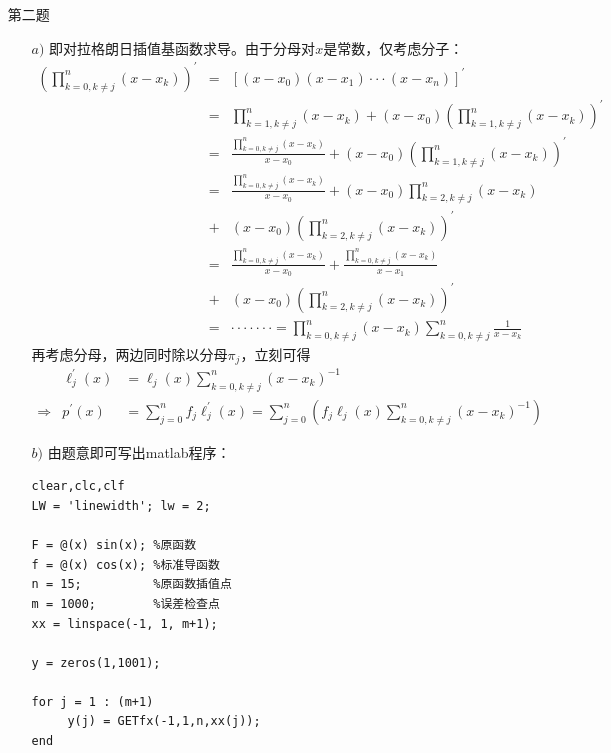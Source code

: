 \documentclass[12pt,a4paper,utf8]{ctexart}
\begin{document}
\begin{enumerate}
\begin{enumerate}
     
  \end{enumerate}
\item[第二题]
  \begin{enumerate}
    \item[$a)$] 即对拉格朗日插值基函数求导。由于分母对$x$是常数，仅考虑分子：
        \begin{eqnarray} 
            \left(\prod_{k=0,k\neq j}^{n}(x-x_k)\right)^{'} &=& [(x-x_0)(x-x_1)···(x-x_n)]^{'}\\
            &=& \prod_{k=1,k\neq j}^{n}(x-x_k)+(x-x_0)\left(\prod_{k=1,k\neq j}^{n}(x-x_k)\right)^{'}\\
            &=& \frac{\prod_{k=0,k\neq j}^{n}(x-x_k)}{x-x_0}+(x-x_0)\left(\prod_{k=1,k\neq j}^{n}(x-x_k)\right)^{'}\\
            &=& \frac{\prod_{k=0,k\neq j}^{n}(x-x_k)}{x-x_0}+ (x-x_0)\prod_{k=2,k\neq j}^{n}(x-x_k)\\
                &+& (x-x_0)\left(\prod_{k=2,k\neq j}^{n}(x-x_k)\right)^{'}   \nonumber\\
            &=& \frac{\prod_{k=0,k\neq j}^{n}(x-x_k)}{x-x_0}+ \frac{\prod_{k=0,k\neq j}^{n}(x-x_k)}{x-x_1}\\
                &+& (x-x_0)\left(\prod_{k=2,k\neq j}^{n}(x-x_k)\right)^{'}   \nonumber\\
            &=& ······· = \prod_{k=0,k\neq j}^{n}(x-x_k)\sum_{k=0,k\neq j}^{n}\frac{1}{x-x_k}
        \end{eqnarray}
        再考虑分母，两边同时除以分母$\pi_{j}$，立刻可得
        \begin{eqnarray} 
           &\ell_{j}^{'}(x)&=\ell_{j}(x)\sum_{k=0,k\neq j}^{n}(x-x_k)^{-1}\\
            \Longrightarrow &p^{'}(x)& = \sum_{j=0}^{n}f_{j}\ell_{j}^{'}(x) =
                         \sum_{j=0}^{n}\left(f_{j}\ell_{j}(x)\sum_{k=0,k\neq j}^{n}(x-x_k)^{-1}\right)    
        \end{eqnarray}

    \item[$b)$] 由题意即可写出matlab程序：
\begin{lstlisting}[frame=single]
    clear,clc,clf
LW = 'linewidth'; lw = 2;

F = @(x) sin(x); %原函数
f = @(x) cos(x); %标准导函数
n = 15;          %原函数插值点
m = 1000;        %误差检查点
xx = linspace(-1, 1, m+1);

y = zeros(1,1001);

for j = 1 : (m+1)
     y(j) = GETfx(-1,1,n,xx(j));
end


\end{lstlisting}
\end{enumerate}
\end{enumerate}
\end{document}
